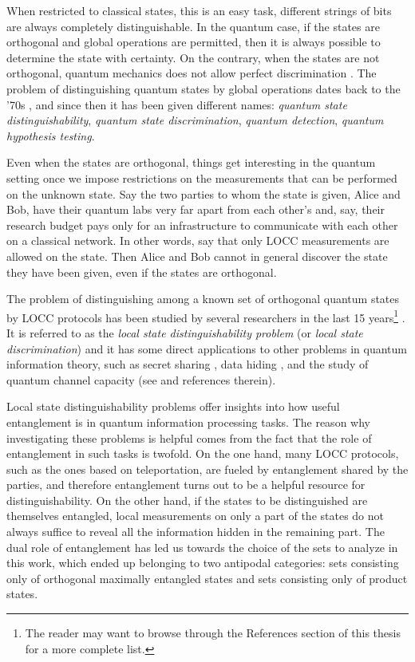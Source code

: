 When restricted to classical states, this is an easy task, 
different strings of bits are always completely distinguishable. 
In the quantum case, if the states are orthogonal and global operations 
are permitted, then it is always possible to determine the state
with certainty.
On the contrary, when the states are not orthogonal, quantum mechanics does not allow 
perfect discrimination \cite{Nielsen11}.
The problem of distinguishing quantum states by global operations 
dates back to the '70s \cite{Helstrom1969},
and since then it has been given different names: 
\emph{quantum state distinguishability}, 
\emph{quantum state discrimination}, \emph{quantum detection}, 
\emph{quantum hypothesis testing}.


Even when the states are orthogonal, things get interesting in the quantum setting 
once we impose 
restrictions on the measurements that can be performed on the unknown state.
Say the two parties to whom the state is given, Alice and Bob,
have their quantum labs very far apart from each other's and, say, their research budget 
pays only for an infrastructure to communicate with each other on a classical network.
In other words, say that only LOCC measurements are allowed on the state. 
Then Alice and Bob cannot in general discover the state they have been given, 
even if the states are orthogonal.

The problem of distinguishing among a known set 
of orthogonal quantum states by LOCC protocols has been studied by several researchers in the last 15 years\footnote{The reader may want to browse through the References section of this thesis for a more complete list.}
\cite{Bennett99,Walgate00,Ghosh01,Horodecki03,Fan04,Ghosh04,Nathanson05,Watrous05,Yu11,Yu12}.
It is referred to as the \emph{local state distinguishability problem} (or 
\emph{local state discrimination}) and it has some direct applications 
to other problems in quantum information theory, 
such as secret sharing \cite{Cleve99,Gottesman00}, 
data hiding \cite{Terhal01a,DiVincenzo2002}, and the study of quantum channel 
capacity (see \cite{Watrous05,Yu11} and references therein).

Local state distinguishability problems offer insights into how useful entanglement 
is in quantum information processing tasks.
The reason why investigating these problems is helpful comes from the fact that the role of entanglement 
in such tasks is twofold. On the one hand, many LOCC protocols, such as the ones based on teleportation, 
are fueled by entanglement shared by the parties, and therefore entanglement turns 
out to be a helpful resource for distinguishability. 
On the other hand, if the states to be distinguished are themselves entangled,
local measurements on only a part of the states do not always suffice to reveal 
all the information hidden in the remaining part.
The dual role of entanglement has led us towards the choice of the sets to analyze 
in this work, which ended up belonging to two antipodal categories: sets consisting only of orthogonal maximally entangled states
and sets consisting only of product states.

